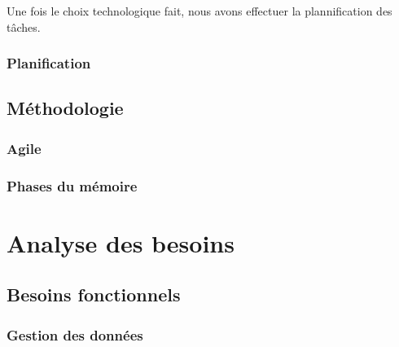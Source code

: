 \documentclass{EPL-master-thesis-covers-FR}
\begin{document}
			Une fois le choix technologique fait, nous avons effectuer la plannification des tâches.
		
		


			\subsection*{Planification}
				\label{sec:planification}

		\section{Méthodologie}


			\subsection*{Agile}
			

				

			\subsection*{Phases du mémoire}

			

	\chapter{Analyse des besoins}
		\label{sec:analyse_besoins}


		\section{Besoins fonctionnels}

			

			\subsection*{Gestion des données}
				\label{sec:gest_donnee}
\end{document}

